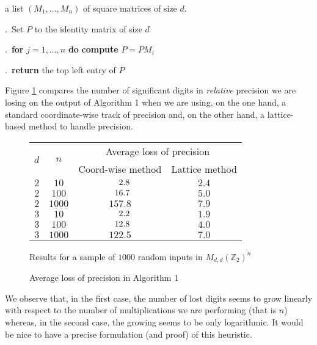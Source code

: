 \documentclass{sig-alternate}
\newcommand{\Z}{\mathbb Z}
\begin{document}
 a list $(M_1, \ldots, M_n)$ of square matrices
of size $d$.

\smallskip

.\ Set $P$ to the identity matrix of size $d$

.\ {\bf for} $j=1,\dots,n$ {\bf do} {\bf compute} $P = P M_i$

.\ {\bf return} the top left entry of $P$

\vspace{-1ex}\noindent\hrulefill

\medskip

\noindent
Figure \ref{fig:mulmatrix} compares the number of significant digits in 
\emph{relative} precision we are losing on the output of Algorithm 1 
when we are using, on the one hand, a standard coordinate-wise track of 
precision and, on the other hand, a lattice-based method to handle 
precision.
%
\begin{figure}
\begin{center}
\renewcommand{\arraystretch}{1.2}
\begin{tabular}{|c|c|c|c|}
\hline
\multirow{2}{*}{\hspace{0.2cm}$d$\hspace{0.2cm}} & 
\multirow{2}{*}{\hspace{0.2cm}$n$\hspace{0.2cm}} & 
\multicolumn{2}{|c|}{Average loss of precision} \\
\cline{3-4}
& & Coord-wise method & Lattice method \\
\hline 
$2$ & $10$ & $\hphantom{00}2.8$ & $2.4$ \\
$2$ & $100$ & $\hphantom{0}16.7$ & $5.0$ \\
$2$ & $1000$ & $157.8$ & $7.9$ \\
\hline
$3$ & $10$ & $\hphantom{00}2.2$ & $1.9$ \\
$3$ & $100$ & $\hphantom{0}12.8$ & $4.0$ \\
$3$ & $1000$ & $122.5$ & $7.0$ \\
\hline
\end{tabular}

\smallskip

{\small
Results for a sample of $1000$ random inputs in $M_{d,d}(\Z_2)^n$}
\end{center}
\renewcommand{\arraystretch}{1}

\vspace{-0.3cm}

\caption{Average loss of precision in Algorithm 1}
\label{fig:mulmatrix}
\end{figure}
%
We observe that, in the first case, the number of lost digits seems to 
grow linearly with respect to the number of multiplications we are 
performing (that is $n$) whereas, in the second case, the growing seems 
to be only logarithmic. It would be nice to have a precise formulation 
(and proof) of this heuristic.
\end{document}
